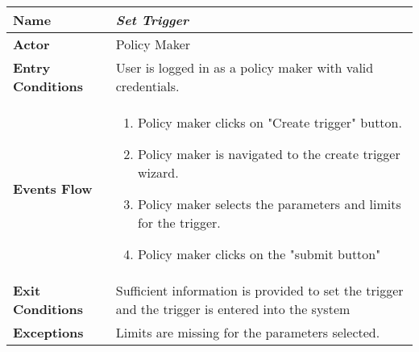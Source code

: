 
\begin{center}
\begin{tabular}{|l|>{\raggedright\arraybackslash}m{12cm}|}

    \hline
    \textbf{Name} & \textit{Set Trigger}\\
    \hline
   	\textbf{Actor} & Policy Maker\\
    \hline
    \textbf{Entry Conditions} & User is logged in as a policy maker with valid credentials.\\
    \hline
    \textbf{Events Flow} & 
    \begin{enumerate}
	    \item Policy maker clicks on "Create trigger" button.
    	\item Policy maker is navigated to the create trigger wizard.
    	\item Policy maker selects the parameters and limits for the trigger.
    	\item Policy maker clicks on the "submit button"
    \end{enumerate} \\ \hline
    \textbf{Exit Conditions} & Sufficient information is provided to set the trigger and the trigger is entered into the system\\
    \hline
    \textbf{Exceptions} & Limits are missing for the parameters selected.\\
    \hline
\end{tabular}
\end{center}